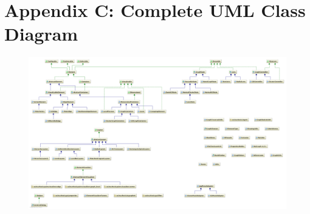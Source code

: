 \section*{Appendix C: Complete UML Class Diagram}
\label{sec:appendix_C}

\begin{figure}[h!]
\centering
\includegraphics[scale=0.22, angle=90]{pictures/uml_diagram.png}
\end{figure}